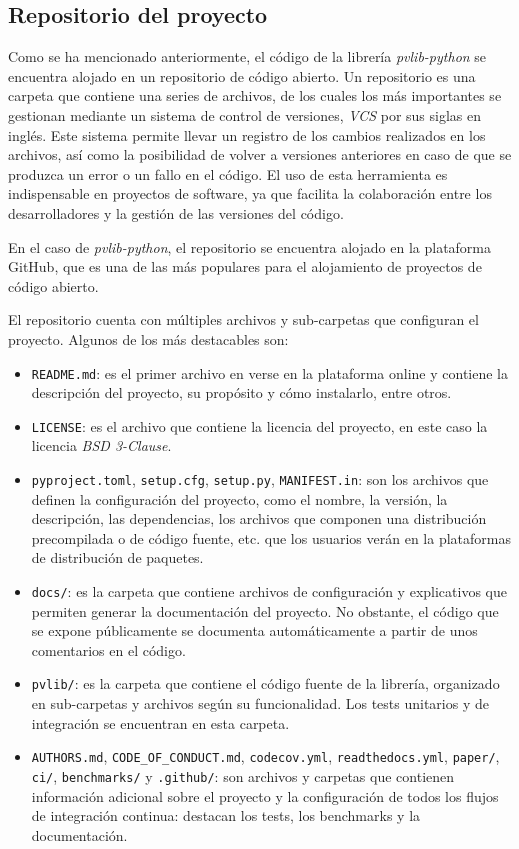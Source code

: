 \subsection{Repositorio del proyecto} \label{ssct:pvlib:repositorio}

Como se ha mencionado anteriormente, el código de la librería \textit{pvlib-python} se encuentra alojado en un repositorio de código abierto. Un repositorio es una carpeta que contiene una series de archivos, de los cuales los más importantes se gestionan mediante un sistema de control de versiones, \textit{VCS} por sus siglas en inglés. Este sistema permite llevar un registro de los cambios realizados en los archivos, así como la posibilidad de volver a versiones anteriores en caso de que se produzca un error o un fallo en el código. El uso de esta herramienta es indispensable en proyectos de software, ya que facilita la colaboración entre los desarrolladores y la gestión de las versiones del código.

En el caso de \textit{pvlib-python}, el repositorio se encuentra alojado en la plataforma GitHub, que es una de las más populares para el alojamiento de proyectos de código abierto.

El repositorio cuenta con múltiples archivos y sub-carpetas que configuran el proyecto. Algunos de los más destacables son:

\begin{itemize}
      \item \texttt{README.md}: es el primer archivo en verse en la plataforma online y contiene la descripción del proyecto, su propósito y cómo instalarlo, entre otros.
      \item \texttt{LICENSE}: es el archivo que contiene la licencia del proyecto, en este caso la licencia \textit{BSD 3-Clause}.
      \item \texttt{pyproject.toml}, \texttt{setup.cfg}, \texttt{setup.py}, \texttt{MANIFEST.in}: son los archivos que definen la configuración del proyecto, como el nombre, la versión, la descripción, las dependencias, los archivos que componen una distribución precompilada o de código fuente, etc. que los usuarios verán en la plataformas de distribución de paquetes.
      \item \texttt{docs/}: es la carpeta que contiene archivos de configuración y explicativos que permiten generar la documentación del proyecto. No obstante, el código que se expone públicamente se documenta automáticamente a partir de unos comentarios en el código.
      \item \texttt{pvlib/}: es la carpeta que contiene el código fuente de la librería, organizado en sub-carpetas y archivos según su funcionalidad. Los tests unitarios y de integración se encuentran en esta carpeta.
      \item \texttt{AUTHORS.md}, \texttt{CODE\_OF\_CONDUCT.md}, \texttt{codecov.yml}, \texttt{readthedocs.yml}, \texttt{paper/}, \texttt{ci/}, \texttt{benchmarks/} y \texttt{.github/}: son archivos y carpetas que contienen información adicional sobre el proyecto y la configuración de todos los flujos de integración continua: destacan los tests, los benchmarks y la documentación.

\end{itemize}

